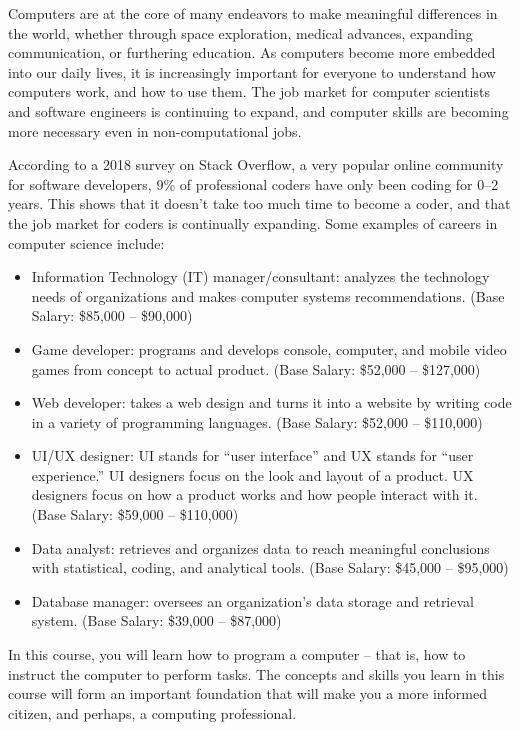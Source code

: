 Computers are at the core of many endeavors to make meaningful differences in the world, whether through space exploration, medical advances, expanding communication, or furthering education. As computers become more embedded into our daily lives, it is increasingly important for everyone to understand how computers work, and how to use them. The job market for computer scientists and software engineers is continuing to expand, and computer skills are becoming more necessary even in non-computational jobs.

According to a 2018 survey on Stack Overflow, a very popular online community for software developers, 9\% of professional coders have only been coding for 0--2 years. This shows that it doesn't take too much time to become a coder, and that the job market for coders is continually expanding. Some examples of careers in computer science include:

\begin{itemize}
\item Information Technology (IT) manager/consultant: analyzes the technology needs of organizations and makes computer systems recommendations. (Base Salary: \$85,000 -- \$90,000)
\item Game developer: programs and develops console, computer, and mobile video games from concept to actual product. (Base Salary: \$52,000 -- \$127,000)
\item Web developer: takes a web design and turns it into a website by writing code in a variety of programming languages. (Base Salary: \$52,000 -- \$110,000)
\item UI/UX designer: UI stands for ``user interface'' and UX stands for ``user experience.'' UI designers focus on the look and layout of a product. UX designers focus on how a product works and how people interact with it. (Base Salary: \$59,000 -- \$110,000)
\item Data analyst: retrieves and organizes data to reach meaningful conclusions with statistical, coding, and analytical tools. (Base Salary: \$45,000 -- \$95,000)
\item Database manager: oversees an organization's data storage and retrieval system. (Base Salary: \$39,000 -- \$87,000)
\end{itemize}
In this course, you will learn how to program a computer -- that is, how to instruct the computer to perform tasks. The concepts and skills you learn in this course will form an important foundation that will make you a more informed citizen, and perhaps, a computing professional. 

